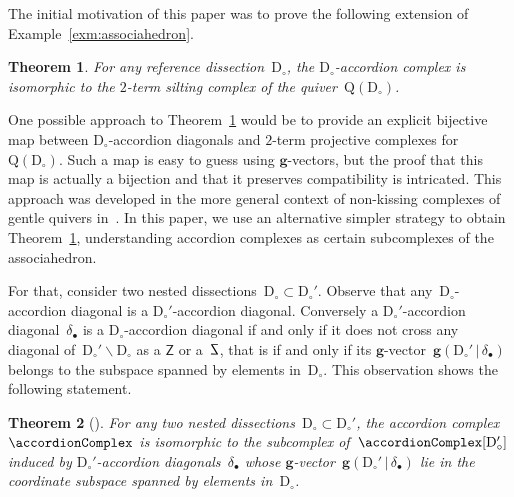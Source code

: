 \documentclass{amsart}
\newtheorem{theorem}{Theorem}%
\theoremstyle{definition}
\renewcommand{\b}[1]{\mathbf{#1}} %
\newcommand{\ssm}{\smallsetminus} %
\newcommand{\dissection}{\mathrm{D}} %
\newcommand{\sign}[3]{\varepsilon \big( {#1} \in {#2}\;|\;{#3} \big)} %
\newcommand{\SSS}{\reflectbox{$\mathsf{Z}$}} %
\newcommand{\ZZZ}{\mathsf{Z}} %
\newcommand{\gvector}[2]{\mathbf{g}(#1 \,|\, #2)} %
\newcommand{\quiver}{\mathrm{Q}} %
\begin{document}
The initial motivation of this paper was to prove the following extension of Example~\ref{exm:associahedron}.

\begin{theorem}
\label{thm:bijectionAccordionComplexSiltingComplex}
For any reference dissection~$\dissection_\circ$, the $\dissection_\circ$-accordion complex is isomorphic to the $2$-term silting complex of the quiver~$\quiver(\dissection_\circ)$.
\end{theorem}

One possible approach to Theorem~\ref{thm:bijectionAccordionComplexSiltingComplex} would be to provide an explicit bijective map between $\dissection_\circ$-accordion diagonals and $2$-term projective complexes for~$\quiver(\dissection_\circ)$.
Such a map is easy to guess using $\b{g}$-vectors, but the proof that this map is actually a bijection and that it preserves compatibility is intricated.
This approach was developed in the more general context of non-kissing complexes of gentle quivers in~\cite{PaluPilaudPlamondon}.
In this paper, we use an alternative simpler strategy to obtain Theorem~\ref{thm:bijectionAccordionComplexSiltingComplex}, understanding accordion complexes as certain subcomplexes of the associahedron.

For that, consider two nested dissections~$\dissection_\circ \subset \dissection_\circ'$.
Observe that any~$\dissection_\circ$-accordion diagonal is a $\dissection_\circ'$-accordion diagonal.
Conversely a $\dissection_\circ'$-accordion diagonal~$\delta_\bullet$ is a $\dissection_\circ$-accordion diagonal if and only if it does not cross any diagonal of~$\dissection_\circ' \ssm \dissection_\circ$ as a $\ZZZ$ or a~$\SSS$, that is if and only if its $\b{g}$-vector~$\gvector{\dissection_\circ'}{\delta_\bullet}$ belongs to the subspace spanned by elements in~$\dissection_\circ$.
This observation shows the following statement.

\begin{theorem}[\cite{MannevillePilaud-accordion}]
\label{thm:contractDiagonals}
For any two nested dissections~$\dissection_\circ \subset \dissection_\circ'$, the accordion complex~$\accordionComplex$ is isomorphic to the subcomplex of~$\accordionComplex[\dissection_\circ']$ induced by $\dissection_\circ'$-accordion diagonals~$\delta_\bullet$ whose $\b{g}$-vector~$\gvector{\dissection_\circ'}{\delta_\bullet}$ lie in the coordinate subspace spanned by elements in~$\dissection_\circ$.
\end{theorem}
\end{document}
